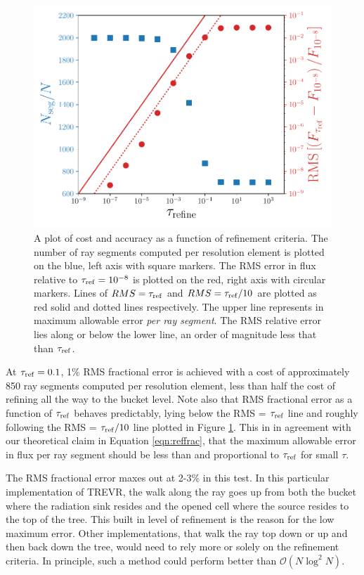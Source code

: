 \documentclass[fleq,usenatbib]{mnras}
\newcommand{\acro}{TREVR}
\newcommand{\bigO}[1]{\mathcal{O}\left(#1\right)}
\newcommand{\tr}{\tau_{\rm ref}}
\begin{document}
\begin{figure}
\includegraphics[width=1\linewidth]{Figures/refinement_criteria.pdf}
\caption{A plot of cost and accuracy as a function of refinement criteria. The 
number of ray segments computed per resolution element is plotted on the blue,
left axis with square markers. The RMS error in flux relative to $\tr
=10^{-8}$ is plotted on the red, right axis with circular markers. Lines of 
$RMS = \tr$ and $RMS = \tr/10$ are plotted as red solid and dotted lines 
respectively. The upper line represents in maximum allowable error 
\textit{per ray segment}. The RMS relative error lies along or below the lower 
line, an order of magnitude less that than $\tr$.}
\label{fig:refcrit}
\end{figure}

At $\tr=0.1$, 1\% RMS fractional error is achieved with a cost of 
approximately 850 ray segments computed per resolution element, less than half 
the cost of refining all the way to the bucket level. Note also that RMS 
fractional error as a function of $\tr$ behaves predictably, lying below the 
RMS = $\tr$ line and roughly following the RMS = $\tr/10$ line plotted in 
Figure \ref{fig:refcrit}. This in in agreement with our theoretical claim in 
Equation \ref{eqn:reffrac}, that the maximum allowable error in flux per ray 
segment should be less than and proportional to $\tr$ for small $\tau$. 

The RMS fractional error maxes out at 2-3\% in this test. In this particular 
implementation of \acro{}, the walk along the ray goes up from both the bucket 
where the radiation sink resides and the opened cell where the source resides 
to the top of the tree. This built in level of refinement is the reason for 
the low maximum error. Other implementations, that walk the ray top down or up 
and then back down the tree, would need to rely more or solely on the 
refinement criteria. In principle, such a method could perform better than 
$\bigO{N\log^2 N}$.
\end{document}
